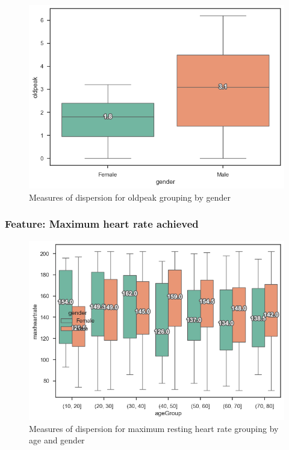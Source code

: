\begin{figure}[H]
    \caption{Measures of dispersion for oldpeak grouping by gender}\label{boxplot-oldpeak-gender}
    \centering
    \includegraphics[width=\linewidth]{media/boxplot-02-gender-oldpeak.png}
\end{figure}

\subsubsection{Feature: Maximum heart rate achieved}

\begin{figure}[H]
    \caption{Measures of dispersion for maximum resting heart rate grouping by age and gender}\label{boxplot-heartrate-age}
    \centering
    \includegraphics[width=\linewidth]{media/boxplot-03-agegroup-gender-heartrate.png}
\end{figure}


